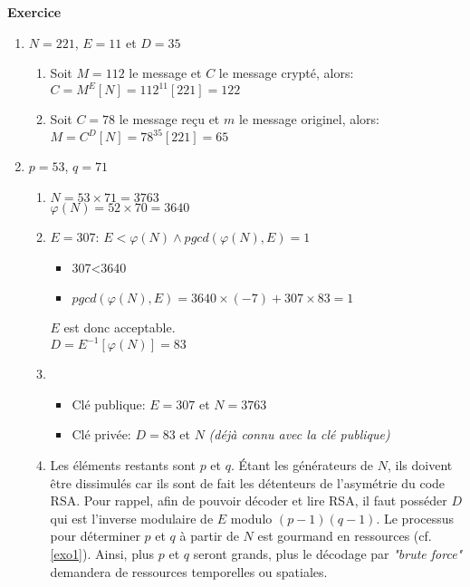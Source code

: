 \documentclass[10pt,a4paper,french]{article}
\newcounter{exercice}[section]
\newenvironment{exercice}[1][]{\refstepcounter{exercice}\par\medskip
   \noindent \textbf{Exercice~\theexercice #1} \rmfamily}{\medskip}
\begin{document}
\begin{exercice}
\begin{enumerate}
\item $N=221$, $E=11$ et $D=35$
\begin{enumerate}
\item Soit $M=112$ le message et $C$ le message crypté, alors:\\
$C=M^{E}[N]=112^{11}[221]=122$
\item Soit $C=78$ le message reçu et $m$ le message originel, alors:\\
$M=C^{D}[N]=78^{35}[221]=65$
\end{enumerate}
\item $p=53$, $q=71$
\begin{enumerate}
\item $N=53\times 71=3763$\\$\varphi(N)=52\times 70=3640$
\item $E=307$: $E<\varphi(N) \land pgcd(\varphi(N),E)=1$
\begin{itemize}
\item 307<3640
\item $pgcd(\varphi(N),E)=3640\times (-7)+307\times 83=1$
\end{itemize}
$E$ est donc acceptable.\\
$D=E^{-1}[\varphi(N)]=83$
\item
\begin{itemize}
\item Clé publique: $E=307$ et $N=3763$
\item Clé privée: $D=83$ et $N$ \textit{(déjà connu avec la clé publique)}
\end{itemize}
\item Les éléments restants sont $p$ et $q$. Étant les générateurs de $N$, ils doivent être dissimulés car ils sont de fait les détenteurs de l'asymétrie du code RSA. Pour rappel, afin de pouvoir décoder et lire RSA, il faut posséder $D$ qui est l'inverse modulaire de $E$ modulo $(p-1)(q-1)$. Le processus pour déterminer $p$ et $q$ à partir de $N$ est gourmand en ressources (cf. \ref{exo1}). Ainsi, plus $p$ et $q$ seront grands, plus le décodage par \textit{"brute force"} demandera de ressources temporelles ou spatiales.
\end{enumerate}
\end{enumerate}
\end{exercice}
\end{document}
